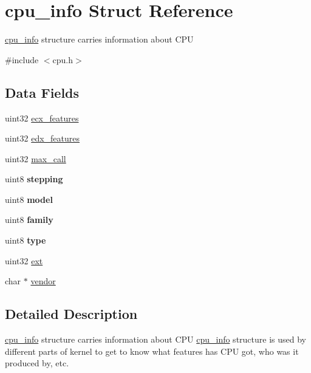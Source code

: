 \hypertarget{structcpu__info}{
\section{cpu\_\-info Struct Reference}
\label{structcpu__info}
}


\hyperlink{structcpu__info}{cpu\_\-info} structure carries information about CPU  




{\ttfamily \#include $<$cpu.h$>$}

\subsection*{Data Fields}
\begin{DoxyCompactItemize}
\item 
uint32 \hyperlink{structcpu__info_a408fc5b4c8d16fc97807d1604d5dfbb8}{ecx\_\-features}
\item 
uint32 \hyperlink{structcpu__info_a3b64d4cb33224305ebe2f5f0613ed779}{edx\_\-features}
\item 
uint32 \hyperlink{structcpu__info_a8919ce198e487044c8e49ea7ccabf031}{max\_\-call}
\item 
\hypertarget{structcpu__info_ad6fd9f9e14dc2350e0a09100b2270d6e}{
uint8 {\bfseries stepping}}
\label{structcpu__info_ad6fd9f9e14dc2350e0a09100b2270d6e}

\item 
\hypertarget{structcpu__info_a2e9603f8370f6735c351c82f4290e88c}{
uint8 {\bfseries model}}
\label{structcpu__info_a2e9603f8370f6735c351c82f4290e88c}

\item 
\hypertarget{structcpu__info_a2e0f25fed158d9dba3f360e3d28df3f5}{
uint8 {\bfseries family}}
\label{structcpu__info_a2e0f25fed158d9dba3f360e3d28df3f5}

\item 
\hypertarget{structcpu__info_a9c10122aa80dc50d3a1118ae20d09d66}{
uint8 {\bfseries type}}
\label{structcpu__info_a9c10122aa80dc50d3a1118ae20d09d66}

\item 
uint32 \hyperlink{structcpu__info_a9476d29ea3c764482313d41dd36a90e4}{ext}
\item 
char $\ast$ \hyperlink{structcpu__info_a4f59bf448826ce3928390aef9e91b069}{vendor}
\end{DoxyCompactItemize}


\subsection{Detailed Description}
\hyperlink{structcpu__info}{cpu\_\-info} structure carries information about CPU \hyperlink{structcpu__info}{cpu\_\-info} structure is used by different parts of kernel to get to know what features has CPU got, who was it produced by, etc.

